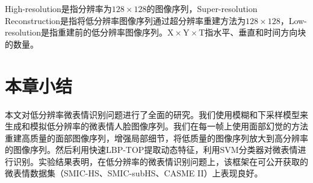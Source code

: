 High-resolution是指分辨率为$ 128 \times 128 $的图像序列，Super-resolution Reconstruction是指将低分辨率图像序列通过超分辨率重建方法为$ 128 \times 128 $，Low-resolution是指重建前的低分辨率图像序列。$ \mathrm{X} \times \mathrm{Y}  \times \mathrm{T} $指水平、垂直和时间方向块的数量。

\section{本章小结}

本文对低分辨率微表情识别问题进行了全面的研究。我们使用模糊和下采样模型来生成和模拟低分辨率的微表情人脸图像序列。我们在每一帧上使用面部幻觉的方法重建高质量的面部图像序列，增强局部细节，将低质量的图像序列放大到高分辨率的图像序列。然后利用快速LBP-TOP提取动态特征，利用SVM分类器对微表情进行识别。实验结果表明，在低分辨率的微表情识别问题上，该框架在可公开获取的微表情数据集（SMIC-HS、SMIC-subHS、CASME II）上表现良好。
